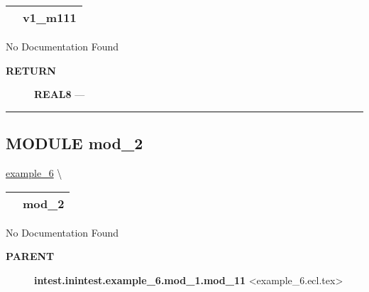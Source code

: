 {\renewcommand{\arraystretch}{1.5}
\begin{tabularx}{\textwidth}{|>{\raggedright\arraybackslash}l|X|}
\hline
\hspace{0pt}\mytexttt{\color{red} } & \textbf{v1\_m111} \\
\hline
\end{tabularx}
}

\par





No Documentation Found








\par
\begin{description}
\item [\colorbox{tagtype}{\color{white} \textbf{\textsf{RETURN}}}] \textbf{REAL8} --- 
\end{description}




\rule{\linewidth}{0.5pt}






\subsection*{\textsf{\colorbox{headtoc}{\color{white} MODULE}
mod\_2}}

\hypertarget{ecldoc:intest.inintest.example_6.mod_2}{}
\hspace{0pt} \hyperlink{ecldoc:intest.inintest.example_6}{example_6} \textbackslash 

{\renewcommand{\arraystretch}{1.5}
\begin{tabularx}{\textwidth}{|>{\raggedright\arraybackslash}l|X|}
\hline
\hspace{0pt}\mytexttt{\color{red} } & \textbf{mod\_2} \\
\hline
\end{tabularx}
}

\par





No Documentation Found










\par
\begin{description}
\item [\colorbox{tagtype}{\color{white} \textbf{\textsf{PARENT}}}] \textbf{intest.inintest.example\_6.mod\_1.mod\_11} <example\_6.ecl.tex>
\end{description}


